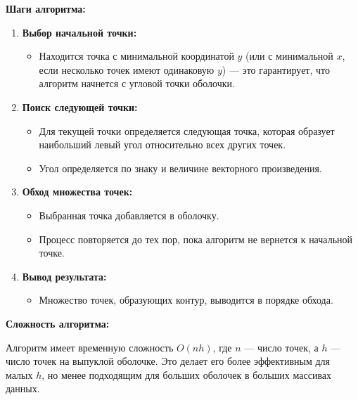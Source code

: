 \documentclass[a4paper,12pt]{article}
\begin{document}
\textbf{Шаги алгоритма:}
\begin{enumerate}
    \item \textbf{Выбор начальной точки:} 
	\begin{itemize}
		\item Находится точка с минимальной координатой $y$ (или с минимальной $x$, если несколько точек имеют одинаковую $y$) — это гарантирует, что алгоритм начнется с угловой точки оболочки.
	\end{itemize}
    \item \textbf{Поиск следующей точки:} 
	\begin{itemize}
		\item Для текущей точки определяется следующая точка, которая образует наибольший левый угол относительно всех других точек.
		\item Угол определяется по знаку и величине векторного произведения.
	\end{itemize}
    \item \textbf{Обход множества точек:}
	\begin{itemize}
		\item Выбранная точка добавляется в оболочку.
		\item Процесс повторяется до тех пор, пока алгоритм не вернется к начальной точке.
	\end{itemize}
    \item \textbf{Вывод результата:}
	\begin{itemize}
		\item Множество точек, образующих контур, выводится в порядке обхода.
	\end{itemize}
\end{enumerate}

\textbf{Сложность алгоритма:}

Алгоритм имеет временную сложность $O(nh)$, где $n$ — число точек, а $h$ — число точек на выпуклой оболочке. Это делает его более эффективным для малых $h$, но менее подходящим для больших оболочек в больших массивах данных.

\newpage

\end{document}
